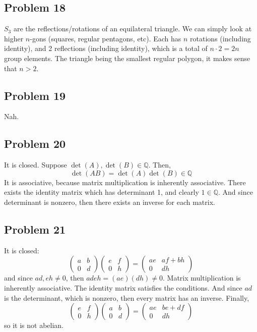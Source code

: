 \documentclass{book}
\begin{document}
\subsection*{Problem 18}
$S_3$ are the reflections/rotations of an equilateral triangle. We can simply look at higher $n$-gons (squares, regular pentagons, etc). Each has $n$ rotations (including identity), and 2 reflections (including identity), which is a total of $n \cdot 2 = 2n$ group elements. The triangle being the smallest regular polygon, it makes sense that $n > 2$.

\subsection*{Problem 19}
Nah.

\subsection*{Problem 20}
It is closed. Suppose $\det(A), \det(B) \in \mathbb{Q}$. Then,
$$\det(AB) = \det(A) \det(B) \in \mathbb{Q}$$
It is associative, because matrix multiplication is inherently associative. There exists the identity matrix which has determinant 1, and clearly $1 \in \mathbb{Q}$. And since determinant is nonzero, then there exists an inverse for each matrix.

\subsection*{Problem 21}
It is closed:
$$\begin{pmatrix}
    a & b \\
    0 & d
\end{pmatrix}
\begin{pmatrix}
    e & f \\
    0 & h
\end{pmatrix}
=\begin{pmatrix}
    ae & af + bh \\
    0 & dh
\end{pmatrix}$$
and since $ad, eh \neq 0$, then $adeh = (ae)(dh) \neq 0$. Matrix multiplication is inherently associative. The identity matrix satisfies the conditions. And since $ad$ is the determinant, which is nonzero, then every matrix has an inverse. Finally,
$$\begin{pmatrix}
    e & f \\
    0 & h
\end{pmatrix}
\begin{pmatrix}
    a & b \\
    0 & d
\end{pmatrix}
=\begin{pmatrix}
    ae & be + df \\
    0 & dh
\end{pmatrix}$$
so it is not abelian.
\end{document}
